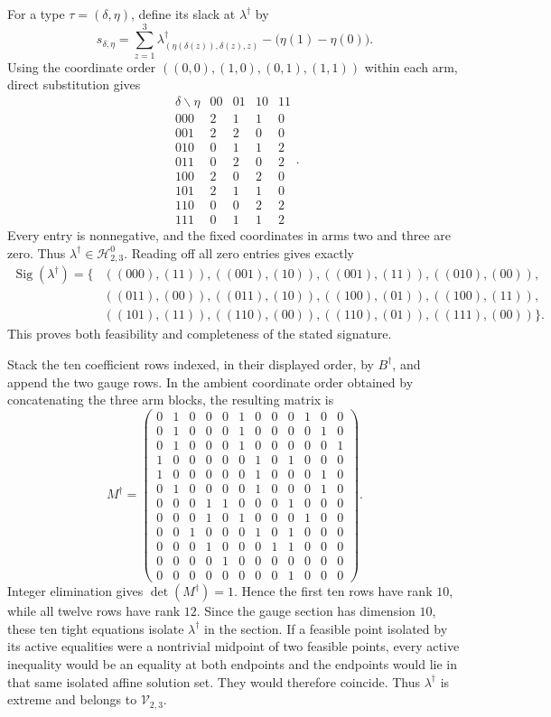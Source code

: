 For a type \(\tau=(\delta,\eta)\), define its slack at \(\lambda^\dagger\) by
\[s_{\delta,\eta}=\sum_{z=1}^{3}\lambda^\dagger_{(\eta(\delta(z)),\delta(z),z)}-\bigl(\eta(1)-\eta(0)\bigr).\]
Using the coordinate order \(((0,0),(1,0),(0,1),(1,1))\) within each arm, direct substitution gives
\[\begin{array}{c|rrrr}\delta\backslash\eta&00&01&10&11\\ \hline 000&2&1&1&0\\ 001&2&2&0&0\\ 010&0&1&1&2\\ 011&0&2&0&2\\ 100&2&0&2&0\\ 101&2&1&1&0\\ 110&0&0&2&2\\ 111&0&1&1&2\end{array}.\]
Every entry is nonnegative, and the fixed coordinates in arms two and three are zero. Thus \(\lambda^\dagger\in\mathcal H^0_{2,3}\). Reading off all zero entries gives exactly
\[\begin{split}\operatorname{Sig}(\lambda^\dagger)=\{&((000),(11)),((001),(10)),((001),(11)),((010),(00)),\\ &((011),(00)),((011),(10)),((100),(01)),((100),(11)),\\ &((101),(11)),((110),(00)),((110),(01)),((111),(00))\}.\end{split}\]
This proves both feasibility and completeness of the stated signature.

Stack the ten coefficient rows indexed, in their displayed order, by \(B^\dagger\), and append the two gauge rows. In the ambient coordinate order obtained by concatenating the three arm blocks, the resulting matrix is
\[M^\dagger=\left(\begin{array}{rrrrrrrrrrrr}0&1&0&0&0&1&0&0&0&1&0&0\\ 0&1&0&0&0&1&0&0&0&0&1&0\\ 0&1&0&0&0&1&0&0&0&0&0&1\\ 1&0&0&0&0&0&1&0&1&0&0&0\\ 1&0&0&0&0&0&1&0&0&0&1&0\\ 0&1&0&0&0&0&1&0&0&0&1&0\\ 0&0&0&1&1&0&0&0&1&0&0&0\\ 0&0&0&1&0&1&0&0&0&1&0&0\\ 0&0&1&0&0&0&1&0&1&0&0&0\\ 0&0&0&1&0&0&0&1&1&0&0&0\\ 0&0&0&0&1&0&0&0&0&0&0&0\\ 0&0&0&0&0&0&0&0&1&0&0&0\end{array}\right).\]
Integer elimination gives \(\det(M^\dagger)=1\). Hence the first ten rows have rank \(10\), while all twelve rows have rank \(12\). Since the gauge section has dimension \(10\), these ten tight equations isolate \(\lambda^\dagger\) in the section. If a feasible point isolated by its active equalities were a nontrivial midpoint of two feasible points, every active inequality would be an equality at both endpoints and the endpoints would lie in that same isolated affine solution set. They would therefore coincide. Thus \(\lambda^\dagger\) is extreme and belongs to \(\mathcal V_{2,3}\).

